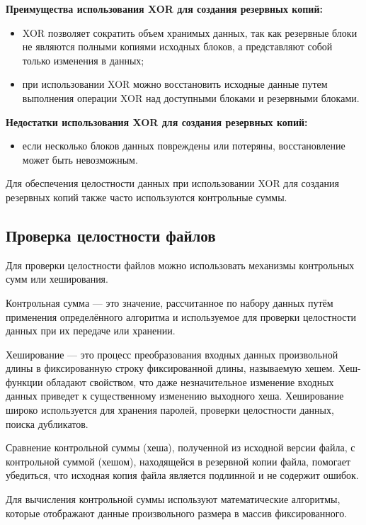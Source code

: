 \textbf{Преимущества использования XOR для создания резервных копий:}
\begin{itemize}
\item XOR позволяет сократить объем хранимых данных, так как резервные блоки не являются полными копиями исходных блоков, а представляют собой только изменения в данных;
\item при использовании XOR можно восстановить исходные данные путем выполнения операции XOR над доступными блоками и резервными блоками.
\end{itemize}

\textbf{Недостатки использования XOR для создания резервных копий:
}
\begin{itemize}
\item если несколько блоков данных повреждены или потеряны, восстановление может быть невозможным.
\end{itemize}

Для обеспечения целостности данных при использовании XOR для создания резервных копий также часто используются контрольные суммы.  

\subsection{Проверка целостности файлов}

Для проверки целостности файлов можно использовать механизмы контрольных сумм или хеширования.

Контрольная сумма --- это значение, рассчитанное по набору данных путём применения определённого алгоритма и используемое для проверки целостности данных при их передаче или хранении. 

Хеширование --- это процесс преобразования входных данных произвольной длины в фиксированную строку фиксированной длины, называемую хешем. Хеш-функции обладают свойством, что даже незначительное изменение входных данных приведет к существенному изменению выходного хеша. Хеширование широко используется для хранения паролей, проверки целостности данных, поиска дубликатов.

Сравнение контрольной суммы (хеша), полученной из исходной версии файла, с контрольной суммой (хешом), находящейся в резервной копии  файла, помогает убедиться, что исходная копия файла является подлинной и не содержит ошибок.

Для вычисления контрольной суммы используют математические алгоритмы, которые отображают данные произвольного размера в массив фиксированного.  

